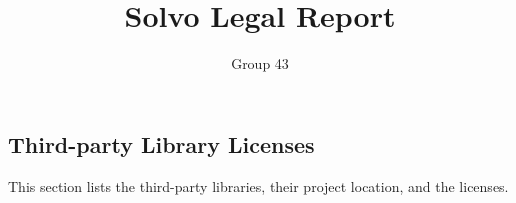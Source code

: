 \documentclass[a4paper]{article}
\begin{document}
    \title{
        \vspace{-3em}
        Solvo Legal Report}
    \author{
        Group 43
    }
    \date{\vspace{-2em}}
    \maketitle


    \subsection*{Third-party Library Licenses}

    This section lists the third-party libraries, their project location, and the licenses.

\end{document}

